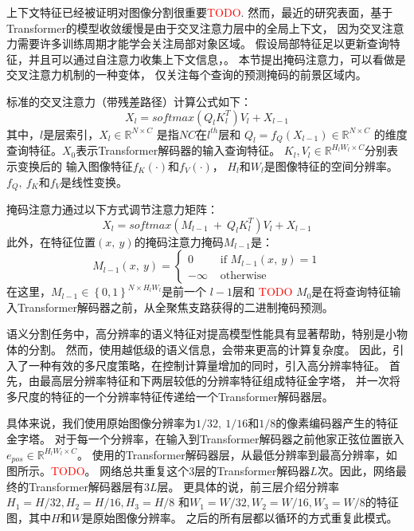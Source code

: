 %
%
%
%
\label{chap:part4_view_enh}
% 
% 
% 
% 
上下文特征已经被证明对图像分割很重要\textcolor{red}{TODO}.
然而，最近的研究表面，基于Transformer的模型收敛缓慢是由于交叉注意力层中的全局上下文，
因为交叉注意力需要许多训练周期才能学会关注局部对象区域。
假设局部特征足以更新查询特征，并且可以通过自注意力收集上下文信息，。
本节提出掩码注意力，可以看做是交叉注意力机制的一种变体，
仅关注每个查询的预测掩码的前景区域内。
\par
% 
% 
% 
% 
标准的交叉注意力（带残差路径）计算公式如下：
\begin{equation}
	X_{l}=softmax(Q_{l}K_{l}^{T})V_{l} + X_{l-1}
\end{equation}
其中，$l$是层索引，$X_{l} \in \mathbb{R}^{N\times C}$
是指$NC$在$l^{th}$层和
$ Q_{l} = f_{Q} \left ( X_{l-1} \right ) \in \mathbb{R}^{N \times C} $
的维度查询特征。$X_{0}$表示Transformer解码器的输入查询特征。
$K_{l},V_{l} \in \mathbb{R}^{H_{l}W_{l} \times C}$分别表示变换后的
输入图像特征$f_{K}(\cdot) $和$ f_{V}( \cdot )$，
$H_{l}$和$W_{l}$是图像特征的空间分辨率。
$f_{Q},~f_{K} $和$ f_{V} $是线性变换。
\par
% 
% 
% 
% 
掩码注意力通过以下方式调节注意力矩阵：
\begin{equation}
	X_{l}=softmax(M_{l-1} ~+~Q_{l}K_{l}^{T})V_{l} + X_{l-1}
\end{equation}
% 
% 
此外，在特征位置$(x,~y)$的掩码注意力掩码$M_{l-1}$是：
\begin{equation}
	M_{l-1}(x,~y)=\begin{cases}
		0  & \text{ if } M_{l-1}(x,~y)= 1\\
		-\infty & \text{ otherwise } 
	  \end{cases}
\end{equation}
% 
% 
在这里，$M_{l-1} \in \left \{  0,1\right \} ^{N \times H_{l}W_{l}} $是前一个
$l-1$层和
\textcolor{red}{TODO}
$M_{0}$是在将查询特征输入Transformer解码器之前，从全聚焦支路获得的二进制掩码预测。
\par
% 
% 
% 
% 
语义分割任务中，高分辨率的语义特征对提高模型性能具有显著帮助，特别是小物体的分割。
然而，使用越低级的语义信息，会带来更高的计算复杂度。
因此，引入了一种有效的多尺度策略，在控制计算量增加的同时，引入高分辨率特征。
首先，由最高层分辨率特征和下两层较低的分辨率特征组成特征金字塔，
并一次将多尺度的特征的一个分辨率特征传递给一个Transformer解码器层。
\par
% 
% 
% 
% 
具体来说，我们使用原始图像分辨率为$1/32,~1/16$和$1/8$的像素编码器产生的特征金字塔。
对于每一个分辨率，在输入到Transformer解码器之前他家正弦位置嵌入
$ e_{pos}\in \mathbb{R}^{H_{l}W_{l}\times C} $。
使用的Transformer解码器层，从最低分辨率到最高分辨率，如图所示。\textcolor{red}{TODO}。
网络总共重复这个3层的Transformer解码器$L$次。因此，网络最终的Transformer解码器层有$3L$层。
更具体的说，前三层介绍分辨率$H_{1}=H/32,H_{2}=H/16,H_{3}=H/8$
和$W_{1}=W/32,W_{2}=W/16,W_{3}=W/8$的特征图，其中$H$和$W$是原始图像分辨率。
之后的所有层都以循环的方式重复此模式。


